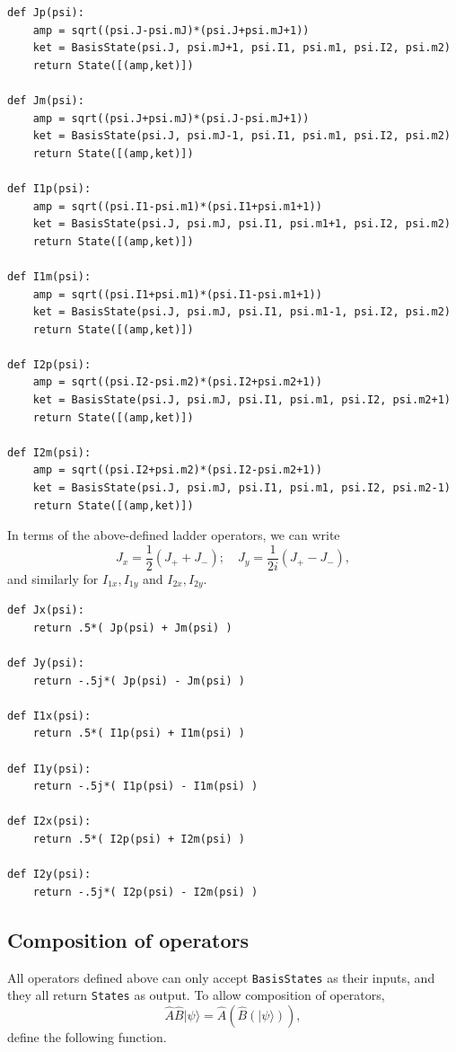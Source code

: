 \begin{lstlisting}
def Jp(psi):
    amp = sqrt((psi.J-psi.mJ)*(psi.J+psi.mJ+1))
    ket = BasisState(psi.J, psi.mJ+1, psi.I1, psi.m1, psi.I2, psi.m2)
    return State([(amp,ket)])

def Jm(psi):
    amp = sqrt((psi.J+psi.mJ)*(psi.J-psi.mJ+1))
    ket = BasisState(psi.J, psi.mJ-1, psi.I1, psi.m1, psi.I2, psi.m2)
    return State([(amp,ket)])

def I1p(psi):
    amp = sqrt((psi.I1-psi.m1)*(psi.I1+psi.m1+1))
    ket = BasisState(psi.J, psi.mJ, psi.I1, psi.m1+1, psi.I2, psi.m2)
    return State([(amp,ket)])

def I1m(psi):
    amp = sqrt((psi.I1+psi.m1)*(psi.I1-psi.m1+1))
    ket = BasisState(psi.J, psi.mJ, psi.I1, psi.m1-1, psi.I2, psi.m2)
    return State([(amp,ket)])

def I2p(psi):
    amp = sqrt((psi.I2-psi.m2)*(psi.I2+psi.m2+1))
    ket = BasisState(psi.J, psi.mJ, psi.I1, psi.m1, psi.I2, psi.m2+1)
    return State([(amp,ket)])

def I2m(psi):
    amp = sqrt((psi.I2+psi.m2)*(psi.I2-psi.m2+1))
    ket = BasisState(psi.J, psi.mJ, psi.I1, psi.m1, psi.I2, psi.m2-1)
    return State([(amp,ket)])
\end{lstlisting}

In terms of the above-defined ladder operators, we can write
%
$$J_x=\frac{1}{2}(J_++J_-);\quad
J_y=\frac{1}{2i}(J_+-J_-),$$
%
and similarly for $I_{1x}, I_{1y}$ and $I_{2x}, I_{2y}$.

\begin{lstlisting}
def Jx(psi):
    return .5*( Jp(psi) + Jm(psi) )

def Jy(psi):
    return -.5j*( Jp(psi) - Jm(psi) )

def I1x(psi):
    return .5*( I1p(psi) + I1m(psi) )

def I1y(psi):
    return -.5j*( I1p(psi) - I1m(psi) )

def I2x(psi):
    return .5*( I2p(psi) + I2m(psi) )

def I2y(psi):
    return -.5j*( I2p(psi) - I2m(psi) )
\end{lstlisting}

\subsection{Composition of operators}

All operators defined above can only accept \verb`BasisStates` as their inputs,
and they all return \verb`States` as output. To allow composition of operators,
%
$$\hat A\hat B|\psi\rangle=\hat A(\hat B(|\psi\rangle)),$$
%
define the following function.

